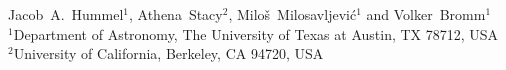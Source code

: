 Jacob~A.~Hummel$^{1}$, Athena~Stacy$^2$, Milo\v s~Milosavljevi\'c$^1$ and Volker~Bromm$^1$\\
$^1$Department of Astronomy, The University of Texas at Austin, TX 78712, USA\\
$^2$University of California, Berkeley, CA 94720, USA
